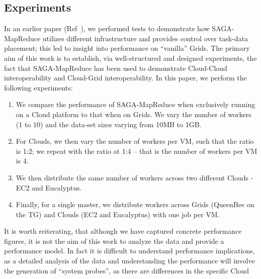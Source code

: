\documentclass[conference,final]{IEEEtran}
\newcommand{\jhanote}[1]{ {\textcolor{red} { ***SJ: #1 }}}
\newcommand{\jhanote}[1]{}
\newcommand{\sagamapreduce }{SAGA-MapReduce }
\begin{document}

\subsection{Experiments} 
In an earlier paper (Ref~\cite{saga_ccgrid09}), we performed tests to
demonstrate how \sagamapreduce utilizes different infrastructure and
provides control over task-data placement; this led to insight into
performance on ``vanilla'' Grids. The primary aim of this work is to
establish, via well-structured and designed experiments, the fact that
\sagamapreduce has been used to demonstrate Cloud-Cloud
interoperability and Cloud-Grid interoperability. In this paper, we
perform the following experiments:
\begin{enumerate}
\item We compare the performance of \sagamapreduce when exclusively
  running on a Cloud platform to that when on Grids. We vary the
  number of workers (1 to 10) and the data-set sizes varying from 10MB
  to 1GB.
\item For Clouds, we then vary the number of workers per VM, such that
  the ratio is 1:2; we repeat with the ratio at 1:4 -- that is the
  number of workers per VM is 4.
\item We then distribute the same number of workers across two
  different Clouds - EC2 and Eucalyptus.
\item Finally, for a single master, we distribute workers across Grids
  (QueenBee on the TG) and Clouds (EC2 and Eucalyptus) with one job
  per VM.
\end{enumerate}
It is worth reiterating, that although we have captured concrete
performance figures, it is not the aim of this work to analyze the
data and provide a performance model. In fact it is difficult to
understand performance implications, as a detailed analysis of the
data and understanding the performance will involve the generation of
``system probes'', as there are differences in the specific Cloud
\end{document}
